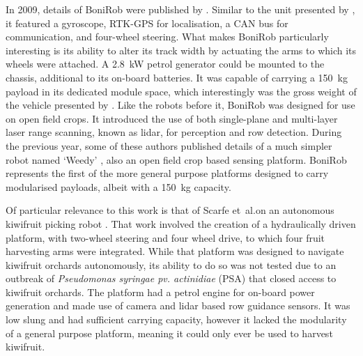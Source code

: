 \documentclass[preprint,authoryear,12pt]{elsarticle}
\begin{document}
        In 2009, details of BoniRob were published by \cite{Ruckelshausen2009}.
        Similar to the unit presented by \cite{Bak2004}, it featured a gyroscope, RTK-GPS for localisation, a CAN bus for communication, and four-wheel steering.
        What makes BoniRob particularly interesting is its ability to alter its track width by actuating the arms to which its wheels were attached.
        A \SI{2.8}{\kilo\watt} petrol generator could be mounted to the chassis, additional to its on-board batteries.
        It was capable of carrying a \SI{150}{\kilo\gram} payload in its dedicated module space, which interestingly was the gross weight of the vehicle presented by \citep{Bak2004}.
        Like the robots before it, BoniRob was designed for use on open field crops.
        It introduced the use of both single-plane and multi-layer laser range scanning, known as lidar, for perception and row detection.
        During the previous year, some of these authors published details of a much simpler robot named `Weedy' \citep{Klose2008}, also an open field crop based sensing platform.
        BoniRob represents the first of the more general purpose platforms designed to carry modularised payloads, albeit with a \SI{150}{\kilo\gram} capacity.

        Of particular relevance to this work is that of Scarfe et~al.\@ on an autonomous kiwifruit picking robot \citep{scarfe2009, Scarfe2012}.
        That work involved the creation of a hydraulically driven platform, with two-wheel steering and four wheel drive, to which four fruit harvesting arms were integrated.
        While that platform was designed to navigate kiwifruit orchards autonomously, its ability to do so was not tested due to an outbreak of \textit{Pseudomonas syringae pv. actinidiae} (PSA) that closed access to kiwifruit orchards.
        The platform had a petrol engine for on-board power generation and made use of camera and lidar based row guidance sensors.
        It was low slung and had sufficient carrying capacity, however it lacked the modularity of a general purpose platform, meaning it could only ever be used to harvest kiwifruit.
\end{document}
